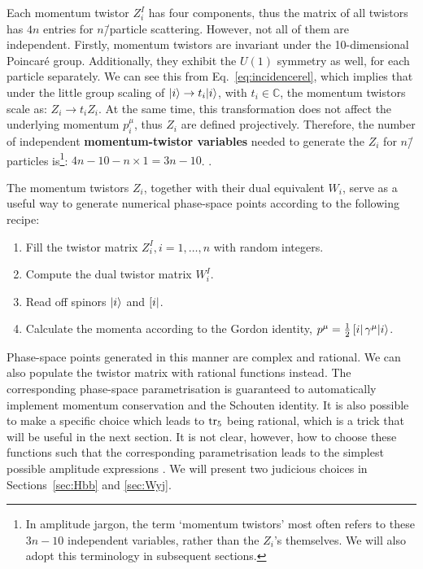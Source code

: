 \documentclass[main.tex]{subfiles}
\begin{document}
Each momentum twistor $Z_i^I$ has four components, thus the matrix of all twistors has $4n$ entries for $n$\=/particle scattering. However, not all of them are independent. Firstly, momentum twistors are invariant under the 10-dimensional Poincaré group. Additionally, they exhibit the $U(1)$ symmetry as well, for each particle separately. We can see this from Eq.~\ref{eq:incidencerel}, which implies that under the little group scaling of $|i \rangle\rightarrow t_i|i \rangle$, with $t_i \in \mathbb{C}$, the momentum twistors scale as: $Z_i \rightarrow t_i Z_i$. At the same time, this transformation does not affect the underlying momentum $p_i^\mu$, thus $Z_i$ are defined projectively. Therefore, the number of independent \textbf{momentum-twistor variables} needed to generate the $Z_i$ for $n$\=/particles is\footnote{In amplitude jargon, the term `momentum twistors' most often refers to these $3n-10$ independent variables, rather than the $Z_i$'s themselves. We will also adopt this terminology in subsequent sections.}: $4n-10-n\times1 = 3n-10$.  .

The momentum twistors $Z_i$, together with their dual equivalent $W_i$, serve as a useful way to generate numerical phase-space points according to the following recipe:
\begin{enumerate}
    \item Fill the twistor matrix $Z_i^I, i=1, \ldots, n$ with random integers.
    \item Compute the dual twistor matrix $W_i^I$.
    \item Read off spinors $|i \rangle$ and $\left[ i \right|$.
    \item Calculate the momenta according to the Gordon identity, $p^\mu = \frac{1}{2}\left[ i \right|\gamma^\mu |i\rangle$.
\end{enumerate}
Phase-space points generated in this manner are complex and rational. We can also populate the twistor matrix with rational functions instead. The corresponding phase-space parametrisation is guaranteed to automatically implement momentum conservation and the Schouten identity. It is also possible to make a specific choice which leads to $\operatorname{\rm tr}_5$ being rational, which is a trick that will be useful in the next section. It is not clear, however, how to choose these functions such that the corresponding parametrisation leads to the simplest possible amplitude expressions . We will present two judicious  choices in Sections~\ref{sec:Hbb} and \ref{sec:Wyj}.
\end{document}
